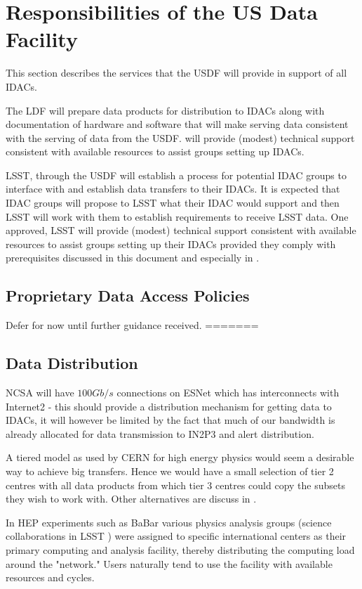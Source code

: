 \section{Responsibilities of the \gls{US} Data Facility}

This section describes the services that the USDF will provide in support of all  IDACs.

The \gls{LDF} will prepare data products for distribution to IDACs along with documentation of hardware and software that will make serving \RO data consistent with the serving of data from the USDF. \RO will provide (modest) technical support consistent with available resources to assist groups setting up IDACs.

LSST, through the USDF will establish a process for potential \gls{IDAC} groups to interface with and establish data transfers to their IDACs. It is expected that \gls{IDAC} groups will propose to \gls{LSST} what their \gls{IDAC} would support and then \gls{LSST} will work with them to establish requirements to receive \gls{LSST} data. One approved, \gls{LSST} will provide (modest) technical support consistent with available resources to assist groups setting up their IDACs provided they comply with prerequisites discussed in this document and especially in .

\subsection{Proprietary Data Access Policies}
{\color{red}Defer for now until further guidance received.} \newline
=======

\subsection{Data Distribution} \label{sec:dist}

NCSA will have $100Gb/s$ connections  on \gls{ESNet} which has interconnects with Internet2 - this should provide a distribution mechanism for getting data to IDACs, it will however be limited by the fact that much of our bandwidth is already allocated for data transmission to \gls{IN2P3} and alert distribution.

A tiered model as used by \gls{CERN} for high energy physics would seem a desirable way to achieve big transfers. Hence we would have a small selection of tier 2 centres with all data products from which tier 3 centres could copy the subsets they wish to work with.  Other alternatives are discuss in .

In \gls{HEP} experiments such as  BaBar various physics analysis groups (science collaborations in \gls{LSST} ) were assigned to specific international centers as their primary computing and analysis facility, thereby distributing the computing load around the "network." Users naturally tend to use the facility with available resources and cycles.


